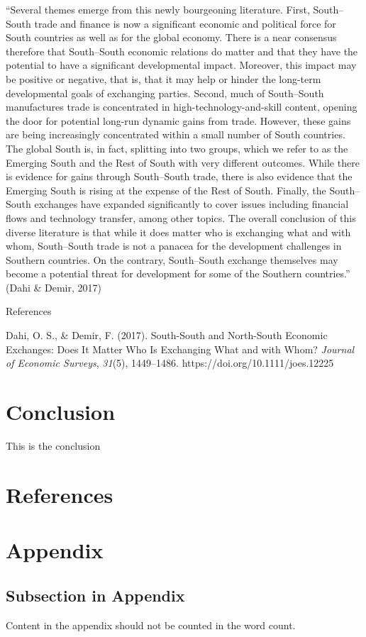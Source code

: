 \documentclass[12pt]{article}%
\begin{document}
``Several themes emerge from this newly bourgeoning literature. First,
South--South trade and finance is now a significant economic and
political force for South countries as well as for the global economy.
There is a near consensus therefore that South--South economic relations
do matter and that they have the potential to have a significant
developmental impact. Moreover, this impact may be positive or negative,
that is, that it may help or hinder the long-term developmental goals of
exchanging parties. Second, much of South--South manufactures trade is
concentrated in high-technology-and-skill content, opening the door for
potential long-run dynamic gains from trade. However, these gains are
being increasingly concentrated within a small number of South
countries. The global South is, in fact, splitting into two groups,
which we refer to as the Emerging South and the Rest of South with very
different outcomes. While there is evidence for gains through
South--South trade, there is also evidence that the Emerging South is
rising at the expense of the Rest of South. Finally, the South--South
exchanges have expanded significantly to cover issues including
financial flows and technology transfer, among other topics. The overall
conclusion of this diverse literature is that while it does matter who
is exchanging what and with whom, South--South trade is not a panacea
for the development challenges in Southern countries. On the contrary,
South--South exchange themselves may become a potential threat for
development for some of the Southern countries.'' (Dahi \& Demir, 2017)

References

Dahi, O. S., \& Demir, F. (2017). South-South and North-South Economic
Exchanges: Does It Matter Who Is Exchanging What and with Whom?
\emph{Journal of Economic Surveys}, \emph{31}(5), 1449--1486.
https://doi.org/10.1111/joes.12225

%
\section{Conclusion}%
\label{sec:Conclusion}%
This is the conclusion

%
\newpage%
\section{References}%
\label{sec:References}%
\printbibliography

%
\newpage%
\section{Appendix}%
\label{sec:Appendix}%
\subsection{Subsection in Appendix}%
\label{subsec:SubsectioninAppendix}%
Content in the appendix should not be counted in the word count.

%
\end{document}
